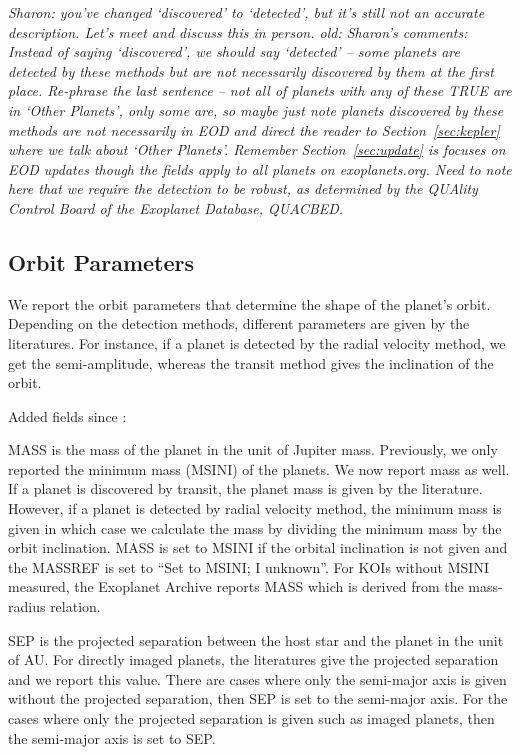 \documentclass[11pt,preprint]{aastex}
\begin{document}
\begin{CJK*}{UTF8}{gbsn}
\textit {Sharon: you've changed `discovered' to `detected', but it's
  still not an accurate description. Let's meet and discuss this in
  person. 
  old: Sharon's
  comments: Instead of saying `discovered', we should say `detected'
  -- some planets are detected by these methods but are not
  necessarily discovered by them at the first place. Re-phrase the
  last sentence -- not all of planets with any of these TRUE are in
  `Other Planets', only some are, so maybe just note planets
  discovered by these methods are not necessarily in EOD and direct
  the reader to Section~\ref{sec:kepler} where we talk about `Other
  Planets'. Remember Section~\ref{sec:update} is focuses on EOD
  updates though the fields apply to all planets on
  exoplanets.org. Need to note here that we require the detection to
  be robust, as determined by the QUAlity Control Board of the
  Exoplanet Database, QUACBED.}


\subsection{Orbit Parameters}
We report the orbit parameters that determine the shape of the planet's orbit. Depending on the detection methods, different parameters are given by the literatures. For instance, if a planet is detected by the radial velocity method, we get the semi-amplitude, whereas the transit method gives the inclination of the orbit. 

Added fields since \cite{Wright2011}:


MASS is the mass of the planet in the unit of Jupiter mass. Previously, we only reported the minimum mass (MSINI) of the planets. We now report mass as well. If a planet is discovered by transit, the planet mass is given by the literature. However, if a planet is detected by radial velocity
method, the minimum mass is given in which case we calculate the mass
by dividing the minimum mass by the orbit inclination. MASS is set to
MSINI if the orbital inclination is not given and the MASSREF is set
to ``Set to MSINI; I unknown''. For KOIs without MSINI measured, the Exoplanet Archive reports MASS which is derived from the mass-radius relation. 


SEP is the projected separation between the host star and the planet in the unit of AU. For directly imaged planets, the literatures give the projected separation and we report this value. There are cases where only the semi-major axis is given without the projected separation, then SEP is set to the semi-major axis. For the cases where only the projected separation is given such as imaged planets, then the semi-major axis is set to SEP. 


\end{CJK*}
\end{document}
